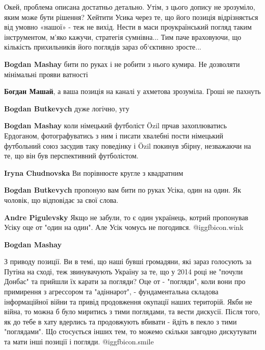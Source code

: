 \begin{itemize}
\begin{itemize}
\end{itemize} %


Окей, проблема описана достатньо детально. Утім, з цього допису не зрозуміло,
яким може бути рішення? Хейтити Усика через те, що його позиція відрізняється
від умовно «нашої» - теж не вихід. Нести в маси проукраїнський погляд таким
інструментом, м’яко кажучи, стратегія сумнівна... Тим паче враховуючи, що
кількість прихильників його поглядів зараз об‘єктивно зросте...

\begin{itemize} %
\textbf{Bogdan Mashay} бити по руках і не робити з нього кумира. Не дозволяти мінімальні прояви ватності

\textbf{Богдан Машай}, а ваша позиція на каналі у ахметова зрозуміла. Гроші не пахнуть

\textbf{Bogdan Butkevych} дуже логічно, угу

\textbf{Bogdan Mashay} коли німецький футболіст Özil прчав захоплюватись Ердоганом, фотографуватись з ним і писати хвалебні пости німецький футбольний союз засудив таку поведінку і Özil покинув збірну, незважаючи на те, що він був перспективний футболістом.

\textbf{Iryna Chudnovska} Ви порівнюєте кругле з квадратним

\textbf{Bogdan Butkevych} пропоную вам бити по руках Усіка, один на один. Як чоловік, що відповідає за свої слова.

\textbf{Andre Pigulevsky} Якщо не забули, то є один українець, котрий пропонував Усіку оце от "один на один". Але Усік чомусь не погодився.  @igg{fbicon.wink} 

\textbf{Bogdan Mashay} 

З приводу позиції. Ви в темі, що наші бувші громадяни, які зараз голосують за
Путіна на сході, теж звинувачують Україну за те, що у 2014 році не "почули
Донбас" та прийшли їх карати за погляди? Оце от - "погляди", коли вони про
примирення з агрессором та "адіннарот", - фундаментальна складова інформаційної
війни та привід продовження окупації наших територій. Якби не війна, то можна б
було миритись з тими поглядами, та вести дискусії. Після того, як до тебе в
хату вдерлись та продовжують вбивати - йдіть в пекло з тими "поглядами". Що
стосується інших тем, то можемо скільки завгодно дискутувати та мати інші
позиції і погляди.  @igg{fbicon.smile} 


\end{itemize}
\end{itemize}
